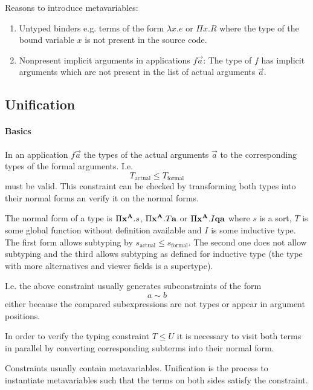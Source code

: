 Reasons to introduce metavariables:
\begin{enumerate}

    \item Untyped binders e.g. terms of the form $\lambda x. e$ or $\Pi x. R$
        where the type of the bound variable $x$ is not present in the source
        code.

    \item Nonpresent implicit arguments in applications $f \vec a$: The type of
        $f$ has implicit arguments which are not present in the list of actual
        arguments $\vec a$.
\end{enumerate}




\subsection{Unification}


\paragraph{Basics}

In an application $f \vec a$ the types of the actual arguments $\vec a$ to the
corresponding types of the formal arguments. I.e.
$$
    T_\text{actual} \le T_\text{formal}
$$
must be valid. This constraint can be checked by transforming both types into
their normal forms an verify it on the normal forms.

The normal form of a type is $\Pi {{\mathbf x}^{{\mathbf A}}}. s$, $\Pi {{\mathbf x}^{{\mathbf A}}}. T {\mathbf a}$ or $\Pi {{\mathbf x}^{{\mathbf A}}} . I {\mathbf q} {\mathbf a}$ where $s$ is a sort, $T$ is some global
function without definition available and $I$ is some inductive type. The first
form allows subtyping by $s_\text{actual} \le s_\text{formal}$. The second one
does not allow subtyping and the third allows subtyping as defined for inductive
type (the type with more alternatives and viewer fields is a supertype).

I.e. the above constraint usually generates subconstraints of the form
$$
    a \sim b
$$
either because the compared subexpressions are not types or appear in argument
positions.

In order to verify the typing constraint $T \le U$ it is necessary to visit both
terms in parallel by converting corresponding subterms into their normal form.

Constraints usually contain metavariables. Unification is the process to
instantiate metavariables such that the terms on both sides satisfy the
constraint.






